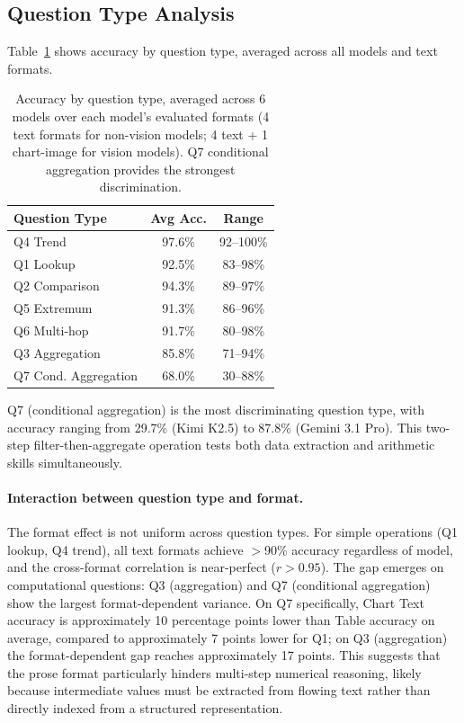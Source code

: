 \documentclass[11pt]{article}
\begin{document}
\subsection{Question Type Analysis}

Table~\ref{tab:qtype} shows accuracy by question type, averaged across all models and text formats.

\begin{table}[t]
\centering
\small
\begin{tabular}{lcc}
\toprule
\textbf{Question Type} & \textbf{Avg Acc.} & \textbf{Range} \\
\midrule
Q4 Trend & 97.6\% & 92--100\% \\
Q1 Lookup & 92.5\% & 83--98\% \\
Q2 Comparison & 94.3\% & 89--97\% \\
Q5 Extremum & 91.3\% & 86--96\% \\
Q6 Multi-hop & 91.7\% & 80--98\% \\
Q3 Aggregation & 85.8\% & 71--94\% \\
Q7 Cond. Aggregation & 68.0\% & 30--88\% \\
\bottomrule
\end{tabular}
\caption{Accuracy by question type, averaged across 6 models over each model's evaluated formats (4 text formats for non-vision models; 4 text + 1 chart-image for vision models). Q7 conditional aggregation provides the strongest discrimination.}
\label{tab:qtype}
\end{table}

Q7 (conditional aggregation) is the most discriminating question type, with accuracy ranging from 29.7\% (Kimi K2.5) to 87.8\% (Gemini 3.1 Pro). This two-step filter-then-aggregate operation tests both data extraction and arithmetic skills simultaneously.

\paragraph{Interaction between question type and format.} The format effect is not uniform across question types. For simple operations (Q1 lookup, Q4 trend), all text formats achieve $>$90\% accuracy regardless of model, and the cross-format correlation is near-perfect ($r{>}0.95$). The gap emerges on computational questions: Q3 (aggregation) and Q7 (conditional aggregation) show the largest format-dependent variance. On Q7 specifically, Chart Text accuracy is approximately 10 percentage points lower than Table accuracy on average, compared to approximately 7 points lower for Q1; on Q3 (aggregation) the format-dependent gap reaches approximately 17 points. This suggests that the prose format particularly hinders multi-step numerical reasoning, likely because intermediate values must be extracted from flowing text rather than directly indexed from a structured representation.
\end{document}
